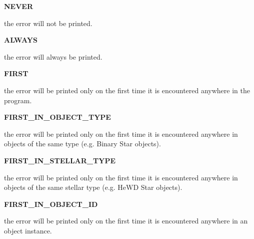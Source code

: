 \hfill
\begin{minipage}{\dimexpr\textwidth-2em}

        \medskip
        \begin{minipage}[t][][b]{14.0em}\textbf{NEVER}\end{minipage}
        \begin{minipage}[t][][b]{\dimexpr\textwidth-14.5em}
            the error will not be printed.
        \end{minipage}\vfill

        \medskip
        \begin{minipage}[t][][b]{14.0em}\textbf{ALWAYS}\end{minipage}
        \begin{minipage}[t][][b]{\dimexpr\textwidth-14.5em}
            the error will always be printed.
        \end{minipage}\vfill

        \medskip
        \begin{minipage}[t][][b]{14.0em}\textbf{FIRST}\end{minipage}
        \begin{minipage}[t][][b]{\dimexpr\textwidth-14.5em}
            the error will be printed only on the first time it is encountered anywhere in the program.
        \end{minipage}\vfill

        \medskip
        \begin{minipage}[t][][b]{14.0em}\textbf{FIRST\_IN\_OBJECT\_TYPE}\end{minipage}
        \begin{minipage}[t][][b]{\dimexpr\textwidth-14.5em}
            the error will be printed only on the first time it is encountered anywhere in objects of the same type (e.g. Binary Star objects).
        \end{minipage}\vfill

        \medskip
        \begin{minipage}[t][][b]{14.0em}\textbf{FIRST\_IN\_STELLAR\_TYPE}\end{minipage}
        \begin{minipage}[t][][b]{\dimexpr\textwidth-14.5em}
            the error will be printed only on the first time it is encountered anywhere in objects of the same stellar type (e.g. HeWD Star objects).
        \end{minipage}\vfill

        \medskip
        \begin{minipage}[t][][b]{14.0em}\textbf{FIRST\_IN\_OBJECT\_ID}\end{minipage}
        \begin{minipage}[t][][b]{\dimexpr\textwidth-14.5em}
            the error will be printed only on the first time it is encountered anywhere in an object instance.
        \end{minipage}\vfill


\end{minipage}
